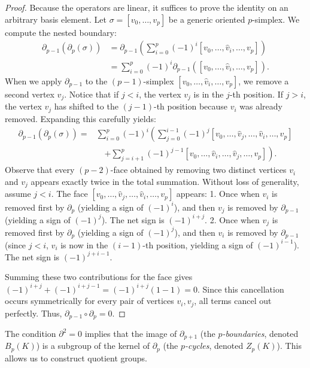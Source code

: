 \begin{proof}
Because the operators are linear, it suffices to prove the identity on an arbitrary basis element. Let $\sigma = [v_0, \dots, v_p]$ be a generic oriented $p$-simplex. We compute the nested boundary:
\begin{align*}
\partial_{p-1}(\partial_p(\sigma)) &= \partial_{p-1} \left( \sum_{i=0}^p (-1)^i [v_0, \dots, \hat{v}_i, \dots, v_p] \right) \\
&= \sum_{i=0}^p (-1)^i \partial_{p-1} ([v_0, \dots, \hat{v}_i, \dots, v_p]).
\end{align*}
When we apply $\partial_{p-1}$ to the $(p-1)$-simplex $[v_0, \dots, \hat{v}_i, \dots, v_p]$, we remove a second vertex $v_j$. Notice that if $j < i$, the vertex $v_j$ is in the $j$-th position. If $j > i$, the vertex $v_j$ has shifted to the $(j-1)$-th position because $v_i$ was already removed. Expanding this carefully yields:
\begin{align*}
\partial_{p-1}(\partial_p(\sigma)) = &\sum_{i=0}^p (-1)^i \left( \sum_{j=0}^{i-1} (-1)^j [v_0, \dots, \hat{v}_j, \dots, \hat{v}_i, \dots, v_p] \right. \\
&\quad \left. + \sum_{j=i+1}^p (-1)^{j-1} [v_0, \dots, \hat{v}_i, \dots, \hat{v}_j, \dots, v_p] \right).
\end{align*}
Observe that every $(p-2)$-face obtained by removing two distinct vertices $v_i$ and $v_j$ appears exactly twice in the total summation. Without loss of generality, assume $j < i$. The face $[v_0, \dots, \hat{v}_j, \dots, \hat{v}_i, \dots, v_p]$ appears:
1. Once when $v_i$ is removed first by $\partial_p$ (yielding a sign of $(-1)^i$), and then $v_j$ is removed by $\partial_{p-1}$ (yielding a sign of $(-1)^j$). The net sign is $(-1)^{i+j}$.
2. Once when $v_j$ is removed first by $\partial_p$ (yielding a sign of $(-1)^j$), and then $v_i$ is removed by $\partial_{p-1}$ (since $j < i$, $v_i$ is now in the $(i-1)$-th position, yielding a sign of $(-1)^{i-1}$). The net sign is $(-1)^{j+i-1}$.

Summing these two contributions for the face gives $(-1)^{i+j} + (-1)^{i+j-1} = (-1)^{i+j}(1 - 1) = 0$. Since this cancellation occurs symmetrically for every pair of vertices $v_i, v_j$, all terms cancel out perfectly. Thus, $\partial_{p-1} \circ \partial_p = 0$.
\end{proof}

The condition $\partial^2 = 0$ implies that the image of $\partial_{p+1}$ (the \emph{$p$-boundaries}, denoted $B_p(K)$) is a subgroup of the kernel of $\partial_p$ (the \emph{$p$-cycles}, denoted $Z_p(K)$). This allows us to construct quotient groups.

